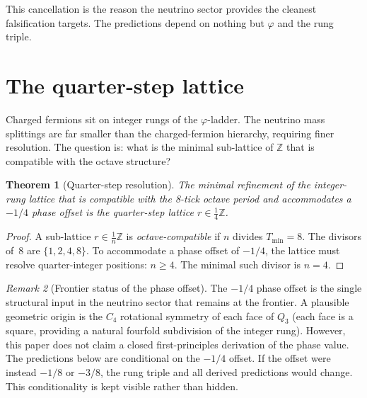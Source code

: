 \documentclass[11pt]{article}
\newtheorem{theorem}{Theorem}
\theoremstyle{remark}
\newtheorem{remark}[theorem]{Remark}
\newcommand{\phig}{\varphi}
\begin{document}
This cancellation is the reason the neutrino sector provides
the cleanest falsification targets.  The predictions depend on
nothing but $\phig$ and the rung triple.

\section{The quarter-step lattice}
\label{sec:quarter}

Charged fermions sit on integer rungs of the $\phig$-ladder.
The neutrino mass splittings are far smaller than the
charged-fermion hierarchy, requiring finer resolution.  The
question is: what is the minimal sub-lattice of $\mathbb{Z}$
that is compatible with the octave structure?

\begin{theorem}[Quarter-step resolution]
\label{thm:quarter}
The minimal refinement of the integer-rung lattice that is
compatible with the 8-tick octave period and accommodates a
$-1/4$ phase offset is the quarter-step lattice
$r\in\tfrac{1}{4}\mathbb{Z}$.
\end{theorem}

\begin{proof}
A sub-lattice $r\in\frac{1}{n}\mathbb{Z}$ is
\emph{octave-compatible} if $n$ divides $T_{\min}=8$.  The
divisors of~$8$ are $\{1,2,4,8\}$.  To accommodate a phase
offset of $-1/4$, the lattice must resolve quarter-integer
positions: $n\geq 4$.  The minimal such divisor is $n=4$.
\end{proof}

\begin{remark}[Frontier status of the phase offset]
\label{rem:frontier}
The $-1/4$ phase offset is the single structural input in the
neutrino sector that remains at the frontier.  A plausible
geometric origin is the $C_4$ rotational symmetry of each face
of $Q_3$ (each face is a square, providing a natural fourfold
subdivision of the integer rung).  However, this paper does not
claim a closed first-principles derivation of the phase value.
The predictions below are conditional on the $-1/4$ offset.
If the offset were instead $-1/8$ or $-3/8$, the rung triple
and all derived predictions would change.  This conditionality
is kept visible rather than hidden.
\end{remark}

\end{document}
